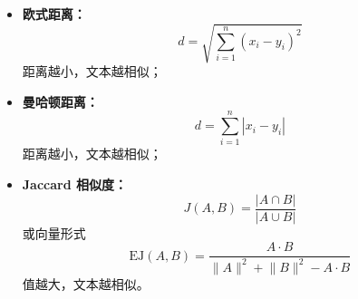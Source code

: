 \documentclass[../main.tex]{subfiles}
\begin{document}
\begin{enumerate}
\begin{itemize}
\begin{itemize}
            \item \textbf{欧式距离：}
            $$
            d=\sqrt{\sum_{i=1}^{n}(x_i-y_i)^2}
            $$
            距离越小，文本越相似；
            
            \item \textbf{曼哈顿距离：}
            $$
            d=\sum_{i=1}^{n}|x_i-y_i|
            $$
            距离越小，文本越相似；
            
            \item \textbf{Jaccard 相似度：}
            $$
            J(A,B)=\frac{|A\cap B|}{|A\cup B|}
            $$
            或向量形式
            $$
            \mathrm{EJ}(A,B)=\frac{A\cdot B}{\lVert A\rVert^2+\lVert B\rVert^2-A\cdot B}
            $$
            值越大，文本越相似。
        \end{itemize}
    \end{itemize}
\end{enumerate}
\end{document}
